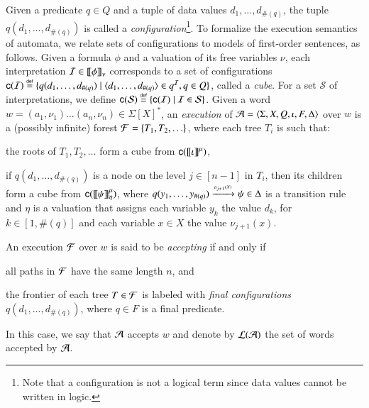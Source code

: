 \documentclass{llncs}
\begin{document}
Given a predicate $q \in Q$ and a tuple of data values
$d_1,\ldots,d_{\#(q)}$, the tuple $q(d_1,\ldots,d_{\#(q)})$ is called
a \emph{configuration}\footnote{Note that a configuration is not a
  logical term since data values cannot be written in logic.}. To
formalize the execution semantics of automata, we relate sets of
configurations to models of first-order sentences, as follows. Given a
formula $\phi$ and a valuation of its free variables $\nu$, each
interpretation $\mathcal{I} \in {\bf [\![} \phi {\bf ]\!]}_\nu$ corresponds to a set of
configurations $\mathsf{c}({\mathcal{I}}) \stackrel{\scriptscriptstyle{\mathsf{def}}}{=} \{ q(d_1,\ldots,d_{\#(q)}) \mid
  \langle d_1,\ldots,d_{\#(q)} \rangle \in q^{\mathcal{I}}, q \in Q \}$, called a
\emph{cube}. For a set $\mathcal{S}$ of interpretations, we define
$\mathsf{c}({\mathcal{S}}) \stackrel{\scriptscriptstyle{\mathsf{def}}}{=} \{ \mathsf{c}({\mathcal{I}}) \mid \mathcal{I} \in
  \mathcal{S} \}$. Given a word $w=(a_1,\nu_1) \ldots (a_n,\nu_n) \in
\Sigma[X]^*$, an \emph{execution} of
$\mathcal{A}=\langle \Sigma,X,Q,\iota,F,\Delta \rangle$ over $w$ is a (possibly
infinite) forest $\mathcal{F} = \{ T_1,T_2,\ldots \}$, where each tree $T_i$ is
such that:
\begin{compactitem}
\item the roots of $T_1, T_2, \ldots$ form a cube from
  $\mathsf{c}({{\bf [\![} \iota {\bf ]\!]}^\mu})$, %
%
%
\item if $q(d_1,\ldots,d_{\#(q)})$ is a node on the level $j \in
  [n-1]$ in $T_i$, then its children form a cube from
  $\mathsf{c}({{\bf [\![} \psi {\bf ]\!]}^\mu_\eta})$, where \(q(y_1,\ldots,y_{\#(q)})
  \xrightarrow{{\scriptscriptstyle a_{j+1}(X)}}_{{\scriptstyle }} \psi \in \Delta\) is a transition rule and
  $\eta$ is a valuation that assigns each variable $y_k$ the value
  $d_k$, for $k \in [1,\#(q)]$ and each variable $x \in X$ the value
  $\nu_{j+1}(x)$. %
\end{compactitem}
An execution $\mathcal{F}$ over $w$ is said to be \emph{accepting} if and only
if \begin{inparaenum}[(i)]
\item all paths in $\mathcal{F}$ have the same length $n$, and
\item the frontier of each tree $T \in \mathcal{F}$ is labeled with \emph{final
  configurations} $q(d_1,\ldots,d_{\#(q)})$, where $q \in F$ is a
  final predicate.
\end{inparaenum} In this case, we say that $\mathcal{A}$ accepts $w$ and
denote by ${\mathcal L}({\mathcal{A}})$ the set of words accepted by $\mathcal{A}$. 
\end{document}
